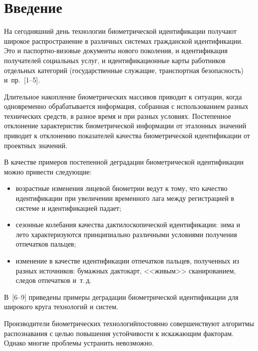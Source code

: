       \begin{multicols}{2}

      \label{st\stat}
      

\section{Введение}

     На сегодняшний день технологии биометрической идентификации получают 
широкое распространение в различных системах гражданской идентификации. Это и 
паспортно-ви\-зо\-вые документы нового поколения, и идентификация получателей 
социальных услуг, и идентификационные карты работников отдельных категорий 
(государственные служащие, транспортная безопасность) \mbox{и~пр.~[1--5]}. 
{ %

}
     
     Длительное накопление биометрических массивов приводит к ситуации, когда 
одновременно обрабатывается информация, собранная с использованием разных 
технических средств, в разное время и при разных условиях. Постепенное отклонение 
характеристик биометрической информации от эталонных значений приводит к 
отклонению показателей качества биометрической идентификации от проектных 
значений. 
     
     В качестве примеров постепенной деградации биометрической идентификации 
можно привести следующие:
     \begin{itemize}
\item возрастные изменения лицевой биометрии ведут к тому, что качество 
идентификации при увеличении временного лага между регистрацией в системе и 
идентификацией падает;
\item сезонные колебания качества дактилоскопической идентификации: зима и лето 
характеризуются принципиально различными условиями получения отпечатков 
пальцев;
\item изменение в качестве идентификации отпечатков пальцев, полученных из разных 
источников: бумажных дактокарт, <<живым>> сканированием, следов отпечатков 
и~т.\,д. 
\end{itemize}

     В~[6--9] приведены примеры деградации биометрической идентификации для 
широкого круга технологий и систем.
     
     Производители биометрических технологий\linebreak постоянно совершенствуют 
алгоритмы распознавания с целью повышения устойчивости к иска\-жа\-ющим факторам. 
Однако многие проблемы устранить невозможно. 
     

\end{multicols}
